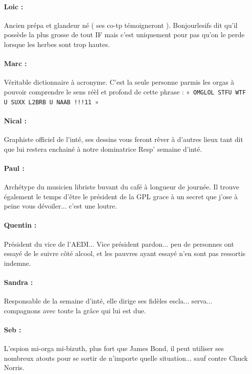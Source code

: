 \paragraph{Loic :} Ancien prépa et glandeur né ( ses co-tp témoigneront ). Bonjourlesifs dit qu'il possède la plus grosse de tout IF mais c'est uniquement pour pas qu'on le perde lorsque les herbes sont trop hautes.
\paragraph{Marc :} Véritable dictionnaire à acronyme. C'est la seule personne
parmis les orgas à pouvoir comprendre le sens réèl et profond de cette phrase : «~\texttt{OMGLOL STFU WTF U SUXX L2BRB U NAAB !!!11}~»
\paragraph{Nical :} Graphiste officiel de l'inté, ses dessins vous feront rêver à d'autres lieux tant dit que lui restera enchainé à notre dominatrice Resp' semaine d'inté.
\paragraph{Paul :} Archétype du musicien libriste buvant du café à longueur de journée. Il trouve également le temps d'être le président de la GPL grace à un secret que j'ose à peine vous dévoiler... c'est une loutre.
\paragraph{Quentin :} Président du vice de l'AEDI... Vice président pardon... peu de personnes ont essayé de le suivre côté alcool, et les pauvres ayant essayé n'en sont pas ressortis indemne.
\paragraph{Sandra :} Responsable de la semaine d'inté, elle dirige ses fidèles escla... serva... compagnons avec toute la grâce qui lui est due.
\vspace{0.5cm}
\paragraph{Seb :} L'espion mi-orga mi-bizuth, plus fort que James Bond, il peut utiliser ses nombreux atouts pour se sortir de n'importe quelle situation... sauf contre Chuck Norris.
\vfill
\columnbreak
{}
